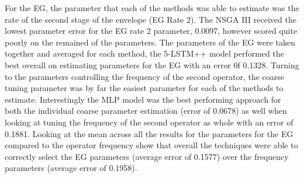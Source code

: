 For the EG, the parameter that each of the methods was able to estimate was the rate of the second stage of the envelope (EG Rate 2). The NSGA III received the lowest parameter error for the EG rate 2 parameter, 0.0097, however scored quite poorly on the remained of the parameters. The parameters of the EG were taken together and averaged for each method, the 5-LSTM++ model performed the best overall on estimating parameters for the EG with an error 0f 0.1328. Turning to the parameters controlling the frequency of the second operator, the coarse tuning parameter was by far the easiest parameter for each of the methods to estimate. Interestingly the MLP model was the best performing approach for both the individual coarse parameter estimation (error of 0.0678) as well when looking at tuning the frequency of the second operator as whole with an error of 0.1881. Looking at the mean across all the results for the parameters for the EG compared to the operator frequency show that overall the techniques were able to correctly select the EG parameters (average error of 0.1577) over the frequency parameters (average error of 0.1958).




